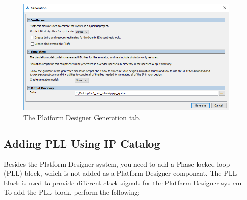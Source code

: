 \documentclass[11pt, twoside, pdftex]{article}
\begin{document}
\begin{figure}[H]
	\centering
	  \includegraphics[scale=0.65]{figures/qsys_system_generation.png}
	\caption{The Platform Designer Generation tab.} 
	\label{fig:qsys_system_generation}
\end{figure}

\subsection{Adding PLL Using IP Catalog}
Besides the Platform Designer system, you need to add a Phase-locked loop (PLL) block, which is not added as a Platform Designer component. The PLL block is used to provide different clock signals for the Platform Designer system. To add the PLL block, perform the following:
\end{document}
